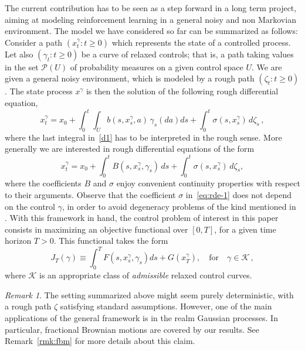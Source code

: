\documentclass[12pt,reqno]{amsart}
\numberwithin{equation}{section}  %
\newcommand{\iot}{\int_{0}^{t}}
\newcommand{\1}{{\bf 1}}
\newcommand{\2}{{\bf 2}}
\newcommand{\cp}{\mathcal P}
\newcommand{\ga}{\gamma}
\newcommand{\si}{\sigma}
\theoremstyle{remark}
\newtheorem{remark}[theorem]{Remark}
\theoremstyle{remark}
\newcommand{\beq}{\begin{equation}}
\newcommand{\eeq}{\end{equation}}
\begin{document}
The current contribution has to be seen as a step forward in a long term project, aiming at modeling reinforcement learning in a general noisy and non Markovian environment. The model we have considered so far can be summarized as follows: 
Consider a path $(x^\gamma_t : t \geq 0)$ which represents the state of a controlled process.  Let also $(\gamma_t : t \geq 0)$ be a curve of relaxed controls; 
that is, a path taking values in the set $\cp(U)$ of probability measures on a given control space $U$.
We are given a general noisy environment, which is modeled by a rough path $(\zeta_{t} : t \geq 0)$.
The state process $x^{\ga}$ is then the solution of the following rough differential equation,
\begin{equation}\label{d1}
x_t^{\ga} = x_0 + \iot \int_{U} b(s, x_s^{\ga}, a) \, \ga_s(da) ds + \iot \si(s, x_s^{\ga}) \, d\zeta_s \, ,
\end{equation}
where the last integral in~\eqref{d1} has to be interpreted in the rough sense.  More generally we are interested in rough differential equations of the form
\beq\label{eq:rde-1}
x_t^{\ga} = x_0 + \iot  B(s, x_s^{\ga}, \ga_s) \, ds + \iot \si(s, x_s^{\ga}) \, d\zeta_s,
\eeq
where the coefficients $B$ and $\si$ enjoy convenient continuity properties with respect to their arguments. Observe that the coefficient $\si$ in~\eqref{eq:rde-1} does not depend on the control $\ga$, in order to avoid degeneracy problems of the kind mentioned in \cite{diehl,allan-cohen}.
With this framework in hand,
the control problem of interest in this paper consists in maximizing an objective functional over $[0,T]$, for a given time horizon $T>0$. This functional takes the form
\beq\label{eq:cont-1}
	J_T(\gamma) \equiv \int_0^T F(s,x_s^\gamma,\gamma_s) ds + G(x_T^\gamma),
	\quad\text{for}\quad \ga\in\mathcal{K} \, ,
\eeq
where $\mathcal K$ is an appropriate class of \emph{admissible} relaxed control curves. 

\begin{remark}
The setting summarized above might seem purely deterministic, with a rough path $\zeta$ satisfying standard assumptions. However, one of the main applications of the general framework is in the realm Gaussian processes. In particular, fractional Brownian motions are covered by our results. See Remark~\ref{rmk:fbm} for more details about this claim.
\end{remark}
\end{document}
